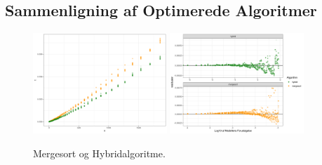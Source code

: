 \subsection{Sammenligning af Optimerede Algoritmer}%
\label{sub:Sammenligning af Optimerede Algoritmer}


\begin{figure}
	\begin{center}
		\includegraphics[width=0.45\textwidth]{../img/toMergesort.png}
		\includegraphics[width=0.45\textwidth]{../img/toMergesortResidual.png}
	\end{center}
	\caption{Mergesort og Hybridalgoritme.}
	\label{fig:Mergesort og Hybridalgoritme}
\end{figure}

